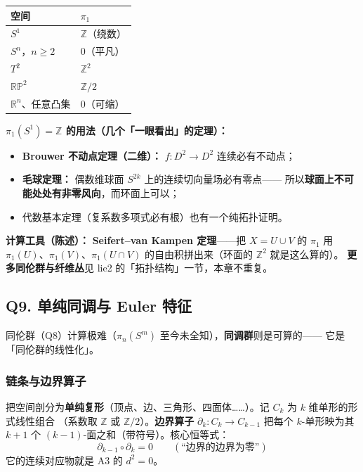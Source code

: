 \begin{center}
\begin{tabular}{ll}
\toprule
\textbf{空间} & $\pi_1$ \\
\midrule
$S^1$ & $\mathbb Z$（绕数） \\
$S^n$，$n\ge2$ & $0$（平凡） \\
$T^2$ & $\mathbb Z^2$ \\
$\mathbb{RP}^2$ & $\mathbb Z/2$ \\
$\mathbb R^n$、任意凸集 & $0$（可缩） \\
\bottomrule
\end{tabular}
\end{center}

\textbf{$\pi_1(S^1)=\mathbb Z$ 的用法（几个「一眼看出」的定理）：}
\begin{itemize}
  \item \textbf{Brouwer 不动点定理（二维）：} $f:D^2\to D^2$ 连续必有不动点；
  \item \textbf{毛球定理：} 偶数维球面 $S^{2k}$ 上的连续切向量场必有零点——
        所以\textbf{球面上不可能处处有非零风向}，而环面上可以；
  \item 代数基本定理（复系数多项式必有根）也有一个纯拓扑证明。
\end{itemize}

\textbf{计算工具（陈述）：} \textbf{Seifert--van Kampen 定理}——把 $X=U\cup V$ 的 $\pi_1$
用 $\pi_1(U)$、$\pi_1(V)$、$\pi_1(U\cap V)$ 的自由积拼出来（环面的 $\mathbb Z^2$ 就是这么算的）。
\textbf{更多同伦群与纤维丛}见 lie2 的「拓扑结构」一节，本章不重复。

\subsection{Q9. 单纯同调与 Euler 特征}

同伦群（Q8）计算极难（$\pi_n(S^m)$ 至今未全知），\textbf{同调群}则是可算的——
它是「同伦群的线性化」。

\subsubsection{链条与边界算子}

把空间剖分为\textbf{单纯复形}（顶点、边、三角形、四面体……）。记 $C_k$ 为 $k$ 维单形的形式线性组合
（系数取 $\mathbb Z$ 或 $\mathbb Z/2$）。\textbf{边界算子} $\partial_k:C_k\to C_{k-1}$ 把每个 $k$-单形映为其 $k+1$ 个
$(k-1)$-面之和（带符号）。核心恒等式：
\[
\partial_{k-1}\circ\partial_k=0 \qquad(\text{“边界的边界为零”})
\]
它的连续对应物就是 A3 的 $d^2=0$。

